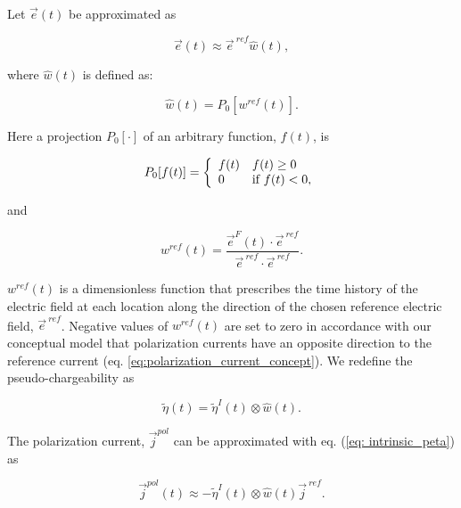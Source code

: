 \documentclass[extra,mreferee]{gji}
\renewcommand {\j}  { {\vec j} }
\newcommand {\e}  { {\vec e} }
\newcommand{\peta}{\tilde{\eta}}
\newcommand{\eref}{\e^{\ ref}}
\newcommand{\jref}{\j^{\ ref}}
\begin{document}

Let $\e(t)$ be approximated as
\begin{linenomath*}
\begin{equation}
  \e(t) \approx \eref \hat{w}(t),
  \label{eq: e_with_eref}
\end{equation}
\end{linenomath*}
where $\hat{w}(t)$ is defined as:
\begin{linenomath*}
\begin{equation}
  \hat{w}(t) = P_0[w^{ref}(t)].
  \label{eq: we}
\end{equation}
\end{linenomath*}
Here a projection $P_0[\cdot]$ of an arbitrary function, $f(t)$, is
\begin{linenomath*}
\begin{equation}
  P_0[f(t)] = \left\{
  \begin{array}{l l}
    f(t) & f(t) \ge 0 \\
    0 & \text{if } f(t) < 0,
  \end{array}\right.
  \label{eq: P0}
\end{equation}
\end{linenomath*}
and
\begin{linenomath*}
\begin{equation}
  w^{ref}(t) = \frac{\e^F(t)\cdot\eref}{\eref\cdot\eref}.
  \label{eq: wref}
\end{equation}
\end{linenomath*}
$w^{ref}(t)$ is a dimensionless function that prescribes the time history of the electric field at each location along the direction of the chosen reference electric field, $\eref$.  Negative values of  $w^{ref}(t)$ are set to zero in accordance with our conceptual model that polarization currents have an opposite direction to the reference current (eq. \ref{eq:polarization_current_concept}).
We redefine the pseudo-chargeability as
\begin{linenomath*}
\begin{equation}
    \peta(t) = \peta^{I}(t)\otimes \hat{w}(t).
    \label{eq: pseudochargeability}
\end{equation}
\end{linenomath*}
The polarization current, $\j^{pol}$ can be approximated with eq. (\ref{eq: intrinsic_peta}) as
\begin{linenomath*}
\begin{equation}
  \j^{pol}(t) \approx - \peta^{I}(t)\otimes \hat{w}(t)\jref.
\end{equation}
\end{linenomath*}
\end{document}
